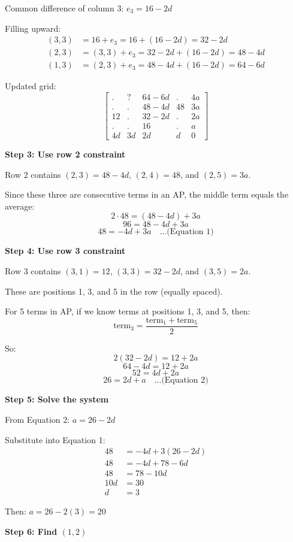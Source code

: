 \documentclass[12pt]{article}
\begin{document}
Common difference of column 3: $e_3 = 16 - 2d$

Filling upward:
\begin{align*}
(3,3) &= 16 + e_3 = 16 + (16 - 2d) = 32 - 2d\\
(2,3) &= (3,3) + e_3 = 32 - 2d + (16 - 2d) = 48 - 4d\\
(1,3) &= (2,3) + e_3 = 48 - 4d + (16 - 2d) = 64 - 6d
\end{align*}

Updated grid:
\[\begin{bmatrix} . & ? &64-6d&.&4a \\ .&.&48-4d&48&3a\\ 12&.&32-2d&.&2a\\ .&.&16&.&a\\ 4d&3d&2d&d&0\end{bmatrix}\]

\textbf{Step 3: Use row 2 constraint}

Row 2 contains $(2,3) = 48 - 4d$, $(2,4) = 48$, and $(2,5) = 3a$.

Since these three are consecutive terms in an AP, the middle term equals the average:
\[2 \cdot 48 = (48 - 4d) + 3a\]
\[96 = 48 - 4d + 3a\]
\[48 = -4d + 3a \quad \text{...(Equation 1)}\]

\textbf{Step 4: Use row 3 constraint}

Row 3 contains $(3,1) = 12$, $(3,3) = 32 - 2d$, and $(3,5) = 2a$.

These are positions 1, 3, and 5 in the row (equally spaced).

For 5 terms in AP, if we know terms at positions 1, 3, and 5, then:
\[\text{term}_3 = \frac{\text{term}_1 + \text{term}_5}{2}\]

So:
\[2(32 - 2d) = 12 + 2a\]
\[64 - 4d = 12 + 2a\]
\[52 = 4d + 2a\]
\[26 = 2d + a \quad \text{...(Equation 2)}\]

\textbf{Step 5: Solve the system}

From Equation 2: $a = 26 - 2d$

Substitute into Equation 1:
\begin{align*}
48 &= -4d + 3(26 - 2d)\\
48 &= -4d + 78 - 6d\\
48 &= 78 - 10d\\
10d &= 30\\
d &= 3
\end{align*}

Then: $a = 26 - 2(3) = 20$

\textbf{Step 6: Find $(1,2)$}
\end{document}
